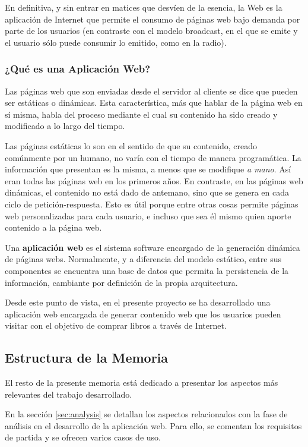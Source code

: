 \documentclass[a4paper]{article}
\begin{document}
    En definitiva, y sin entrar en matices que desvíen de la esencia, la Web es la aplicación de Internet que permite el consumo de páginas web bajo demanda por parte de los usuarios (en contraste con el modelo broadcast, en el que se emite y el usuario sólo puede consumir lo emitido, como en la radio).
    
    \subsubsection{¿Qué es una Aplicación Web?}
    Las páginas web que son enviadas desde el servidor al cliente se dice que pueden ser estáticas o dinámicas. Esta característica, más que hablar de la página web en sí misma, habla del proceso mediante el cual su contenido ha sido creado y modificado a lo largo del tiempo.
   	
   	Las páginas estáticas lo son en el sentido de que su contenido, creado comúnmente por un humano, no varía con el tiempo de manera programática. La información que presentan es la misma, a menos que se modifique \emph{a mano}. Así eran todas las páginas web en los primeros años. En contraste, en las páginas web dinámicas, el contenido no está dado de antemano, sino que se genera en cada ciclo de petición-respuesta. Esto es útil porque entre otras cosas permite páginas web personalizadas para cada usuario, e incluso que sea él mismo quien aporte contenido a la página web.
    
    Una \textbf{aplicación web} es el sistema software encargado de la generación dinámica de páginas webs. Normalmente, y a diferencia del modelo estático, entre sus componentes se encuentra una base de datos que permita la persistencia de la información, cambiante por definición de la propia arquitectura.
    
    Desde este punto de vista, en el presente proyecto se ha desarrollado una aplicación web encargada de generar contenido web que los usuarios pueden visitar con el objetivo de comprar libros a través de Internet.

    \subsection{Estructura de la Memoria}
    El resto de la presente memoria está dedicado a presentar los aspectos más relevantes del trabajo desarrollado.
    
    En la sección \ref{sec:analysis} se detallan los aspectos relacionados con la fase de análisis en el desarrollo de la aplicación web. Para ello, se comentan los requisitos de partida y se ofrecen varios casos de uso.
    
\end{document}
